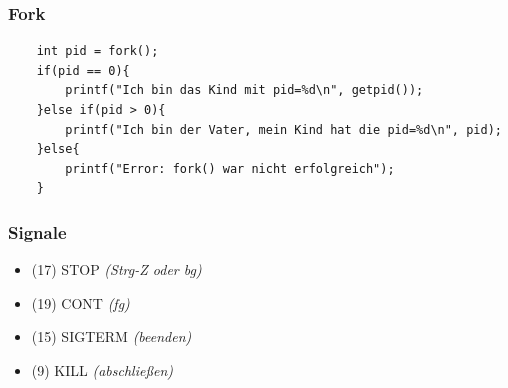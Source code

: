 \subsubsection{Fork}
\begin{lstlisting}
    int pid = fork();
    if(pid == 0){
        printf("Ich bin das Kind mit pid=%d\n", getpid());
    }else if(pid > 0){
        printf("Ich bin der Vater, mein Kind hat die pid=%d\n", pid);
    }else{
        printf("Error: fork() war nicht erfolgreich");
    }
\end{lstlisting}

\subsubsection{Signale}
\begin{itemize}
    \item (17) STOP \textit{(Strg-Z oder bg)}
    \item (19) CONT \textit{(fg)}
    \item (15) SIGTERM \textit{(beenden)}
    \item (9) KILL \textit{(abschließen)}
\end{itemize}